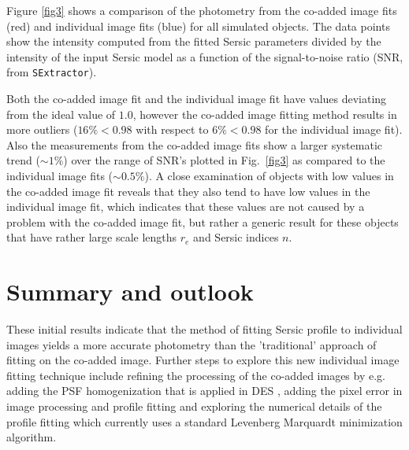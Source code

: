 Figure \ref{fig3} shows a comparison of the photometry from the co-added image fits (red)
and individual image fits (blue) for all simulated objects. The data points show the
intensity computed from the fitted Sersic parameters divided by the intensity of the
input Sersic model as a function of the signal-to-noise ratio (SNR, from {\tt SExtractor}).

Both the co-added image fit and the individual image fit have values deviating from
the ideal value of $1.0$, however the co-added image fitting method results in more
outliers ($16\%< 0.98$ with respect to $6\% < 0.98$ for the individual image fit).
Also the measurements from the co-added image fits show a larger
systematic trend ($\sim1\%$) over the range of SNR's plotted in Fig.\ \ref{fig3} as compared
to the individual image fits ($\sim0.5\%$). A close examination
of objects with low values in the co-added image fit reveals that they also
tend to have low values in the individual image fit, which indicates that
these values are not caused by a problem with the co-added image fit, but rather
a generic result for these objects that have rather large scale lengths $r_e$
and Sersic indices $n$.

\section{Summary and outlook}
These initial results indicate that the method of fitting Sersic profile to
individual images yields a more accurate photometry 
than the 'traditional' approach of
fitting on the co-added image. Further steps to explore this new individual image
fitting technique include refining the processing of the co-added images by e.g.
adding the PSF homogenization that is applied in DES \citep{2008SPIE.7016E..17M},
adding the pixel error in image processing and profile fitting and exploring the
numerical details of the profile fitting which currently uses a standard
Levenberg Marquardt minimization algorithm.


